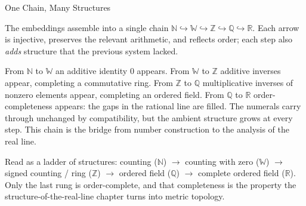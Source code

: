 \label{sec:one-chain-many-structures}

\begin{topicbox}{One Chain, Many Structures}
\begin{exposition}
The embeddings assemble into a single chain $\mathbb{N}\hookrightarrow\mathbb{W}\hookrightarrow\mathbb{Z}\hookrightarrow\mathbb{Q}\hookrightarrow\mathbb{R}$. Each arrow is injective, preserves the relevant arithmetic, and reflects order; each step also \emph{adds} structure that the previous system lacked.
\end{exposition}
\begin{exposition}
From $\mathbb{N}$ to $\mathbb{W}$ an additive identity $0$ appears. From $\mathbb{W}$ to $\mathbb{Z}$ additive inverses appear, completing a commutative ring. From $\mathbb{Z}$ to $\mathbb{Q}$ multiplicative inverses of nonzero elements appear, completing an ordered field. From $\mathbb{Q}$ to $\mathbb{R}$ order-completeness appears: the gaps in the rational line are filled. The numerals carry through unchanged by compatibility, but the ambient structure grows at every step. This chain is the bridge from number construction to the analysis of the real line.
\end{exposition}
\end{topicbox}
\begin{remark*}[Exposition]
Read as a ladder of structures: counting ($\mathbb{N}$) $\to$ counting with zero ($\mathbb{W}$) $\to$ signed counting / ring ($\mathbb{Z}$) $\to$ ordered field ($\mathbb{Q}$) $\to$ complete ordered field ($\mathbb{R}$). Only the last rung is order-complete, and that completeness is the property the structure-of-the-real-line chapter turns into metric topology.
\end{remark*}
